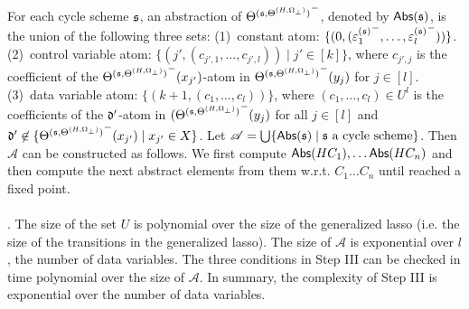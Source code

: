 For each cycle scheme ${\mathfrak{s} }$, an abstraction of ${\Theta^{({\mathfrak{s} }, \Theta^{(H,\Omega_\bot)})}}^-$, denoted by $\mathsf{Abs}({\mathfrak{s} })$,  is the union of the following three sets:
(1)~constant atom: $\{(0, ( {\varepsilon^{({\mathfrak{s} })}_{1}}^-,\dots, {\varepsilon^{({\mathfrak{s} })}_l}^-))\}$. 
(2)~control variable atom: $\{(j', (c_{j',1},\dots, c_{j', l})) \mid j' \in [k]\}$, where $c_{j', j}$ is the coefficient of the ${\Theta^{({\mathfrak{s} },\Theta^{(H,\Omega_\bot)})}}^-(x_{j'})$-atom in ${\Theta^{({\mathfrak{s} },\Theta^{(H,\Omega_\bot)})}}^-(y_{j})$ for $j\in[l]$. (3)~data variable atom: $\{(k+1, (c_1,\dots,c_l))\}$, where $(c_1,\dots,c_l) \in U^l$ is the coefficients of the $\mathfrak{d}'$-atom in ${(\Theta^{({\mathfrak{s} },\Theta^{(H,\Omega_\bot)})}}^-(y_{j})$ for all $j \in [l]$ and $\mathfrak{d}'\not\in \{{\Theta^{({\mathfrak{s} },\Theta^{(H,\Omega_\bot)})}}^-(x_{j'})\mid x_{j'}\in X\}$.
Let $\mathscr{A}=\bigcup \{\mathsf{Abs}({\mathfrak{s} }) \mid {\mathfrak{s} } \mbox{ a cycle scheme}\}$. Then $\mathscr{A}$ can be constructed as follows. We first compute $\mathsf{Abs}(HC_1), \ldots \mathsf{Abs}(HC_n)$ and then compute the next abstract elements from them w.r.t. $C_1\ldots C_n$ until reached a fixed point.\medskip\\
\smallskip\\

. The size of the set $U$ is polynomial over the size of the generalized lasso (i.e. the size of the transitions in the generalized lasso). The size of $\mathscr{A}$ is exponential over $l$, the number of data variables. The three conditions in Step III can be checked in time polynomial over the size of $\mathscr{A}$. In summary, the complexity of Step III is exponential over the number of data variables.

